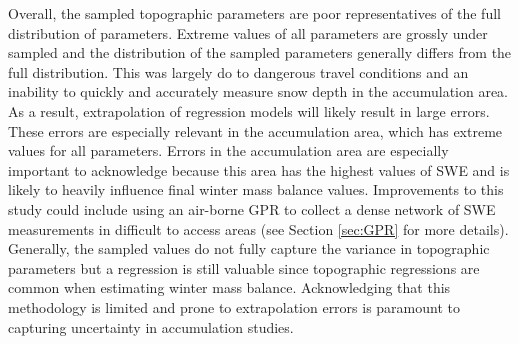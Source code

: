 \documentclass{sfuthesis}
\begin{document}
Overall, the sampled topographic parameters are poor representatives of the full distribution of parameters. Extreme values of all parameters are grossly under sampled and the distribution of the sampled parameters generally differs from the full distribution. This was largely do to dangerous travel conditions and an inability to quickly and accurately measure snow depth in the accumulation area. As a result, extrapolation of regression models will likely result in large errors. These errors are especially relevant in the accumulation area, which has extreme values for all parameters. Errors in the accumulation area are especially important to acknowledge because this area has the highest values of SWE and is likely to heavily influence final winter mass balance values. Improvements to this study could include using an air-borne GPR to collect a dense network of SWE measurements in difficult to access areas \citep[e.g.][]{McGrath2015} (see Section \ref{sec:GPR} for more details). Generally, the sampled values do not fully capture the variance in topographic parameters but a regression is still valuable  since topographic regressions are common when estimating winter mass balance. Acknowledging that this methodology is limited and prone to extrapolation errors is paramount to capturing uncertainty in accumulation studies. 
\end{document}
